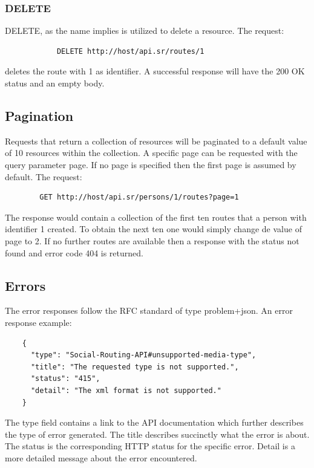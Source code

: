         \subsubsection*{DELETE}
        DELETE, as the name implies is utilized to delete a resource. The request: 
        \begin{verbatim}
            DELETE http://host/api.sr/routes/1
        \end{verbatim}
        \vspace{-\baselineskip} 
        deletes the route with 1 as identifier. A successful response will have the 200 OK status and an empty body.
    
    \subsection{Pagination}
    Requests that return a collection of resources will be paginated to a default value of 10 resources within the collection. 
    A specific page can be requested with the query parameter page. If no page is specified then the first page is assumed by default.
    The request:  
    \begin{verbatim}
        GET http://host/api.sr/persons/1/routes?page=1
    \end{verbatim}
    \vspace{-\baselineskip}
    The response would contain a collection of the first ten routes that a person with identifier 1 created.
    To obtain the next ten one would simply change de value of page to 2. If no further routes are available then a response with
    the status not found and error code 404 is returned.

    \subsection{Errors}
    The error responses follow the RFC standard of type problem+json\cite{jsonproblemonlinedocs}. An error response example:
    
    \begin{lstlisting}
    {
      "type": "Social-Routing-API#unsupported-media-type",
      "title": "The requested type is not supported.",
      "status": "415",
      "detail": "The xml format is not supported."
    }
    \end{lstlisting}

    The type field contains a link to the API documentation which further describes the type of error generated.
    The title describes succinctly what the error is about.
    The status is the corresponding HTTP status for the specific error.
    Detail is a more detailed message about the error encountered.

